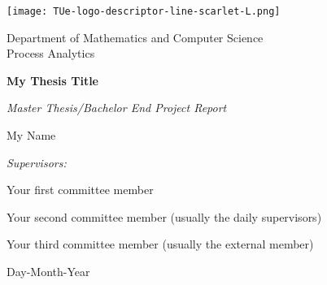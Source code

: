 \documentclass[12pt,a4paper,footinclude=true,twoside,headinclude=true]{report}
\begin{document}
\begin{titlepage}
\centering
\texttt{[image: TUe-logo-descriptor-line-scarlet-L.png]}\par
Department of Mathematics and Computer Science\\
Process Analytics

\vspace{3cm}
{\LARGE\textbf{My Thesis Title}}\par\vspace{0.5cm}
{\large\textit{Master Thesis/Bachelor End Project Report}}\par\vspace{1cm}
{\large My Name}\par

\vfill

\emph{Supervisors:}\par
Your first committee member\par
Your second committee member (usually the daily supervisors)\par
Your third committee member (usually the external member)\par

\vspace{2cm}

{Day-Month-Year}

\end{titlepage}
\end{document}

